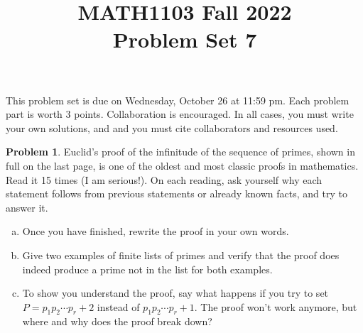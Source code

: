 \documentclass[11pt,oneside]{amsart}
\title{MATH1103 Fall 2022\\
Problem Set 7}
\theoremstyle{definition}
\newtheorem{problem}{Problem}
\theoremstyle{plain}
\begin{document}
    \maketitle
    This problem set is due on Wednesday, October 26 at 11:59 pm. Each problem part is worth 3 points. Collaboration is encouraged. In all cases, you must write your own solutions, and and you must cite collaborators and resources used.

    \begin{problem}
        Euclid's proof of the infinitude of the sequence of primes, shown in full on the last page, is one of the oldest and most classic proofs in mathematics. Read it 15 times (I am serious!). On each reading, ask yourself why each statement follows from previous statements or already known facts, and try to answer it.
        \begin{enumerate}[(a)]
            \item Once you have finished, rewrite the proof in your own words.
            \item Give two examples of finite lists of primes and verify that the proof does indeed produce a prime not in the list for both examples.
            \item To show you understand the proof, say what happens if you try to set $P=p_1p_2\cdots p_r+2$ instead of $p_1p_2\cdots p_r+1$. The proof won't work anymore, but where and why does the proof break down?
        \end{enumerate}
    \end{problem}
\end{document}
